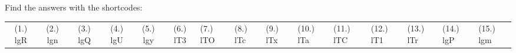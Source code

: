       

    
  \label{m38712**end}
          
       
    
  \label{0044f0dab6cfd2ca2bac282dc4009886**end}
    
\par {} Find the answers with the shortcodes:
 \par \begin{tabular}[h]{cccccc}
 (1.) lgR  &  (2.) lgn  &  (3.) lgQ  &  (4.) lgU  &  (5.) lgy  &  (6.) lT3  &  (7.) lTO  &  (8.) lTc  &  (9.) lTx  &  (10.) lTa  &  (11.) lTC  &  (12.) lT1  &  (13.) lTr  &  (14.) lgP  &  (15.) lgm  & \end{tabular}




